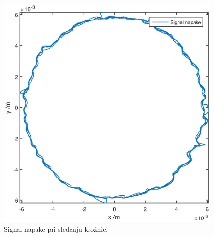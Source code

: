 \begin{figure}
	\centering
	\includegraphics[scale=0.5]{./Slike/follow_circle_err.eps}
	\caption{Signal napake pri sledenju kro\v{z}nici}
	\label{fig:follow_circle_err}
\end{figure}
